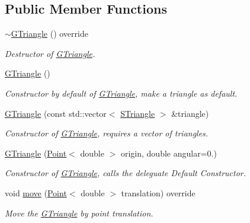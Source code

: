 \subsection*{Public Member Functions}
\begin{DoxyCompactItemize}
\item 
\mbox{\label{classGTriangle_a05bcaee071e6dc6591220869234b05ee}} 
\hyperlink{classGTriangle_a05bcaee071e6dc6591220869234b05ee}{$\sim$\+G\+Triangle} () override
\begin{DoxyCompactList}\small\item\em Destructor of \hyperlink{classGTriangle}{G\+Triangle}. \end{DoxyCompactList}\item 
\mbox{\label{classGTriangle_a10ffcfa49d2f3f8dc4b87b106dfe4456}} 
\hyperlink{classGTriangle_a10ffcfa49d2f3f8dc4b87b106dfe4456}{G\+Triangle} ()
\begin{DoxyCompactList}\small\item\em Constructor by default of \hyperlink{classGTriangle}{G\+Triangle}, make a triangle as default. \end{DoxyCompactList}\item 
\hyperlink{classGTriangle_a969f76093f398cda98268aba05d57336}{G\+Triangle} (const std\+::vector$<$ \hyperlink{classSTriangle}{S\+Triangle} $>$ \&triangle)
\begin{DoxyCompactList}\small\item\em Constructor of \hyperlink{classGTriangle}{G\+Triangle}, requires a vector of triangles. \end{DoxyCompactList}\item 
\hyperlink{classGTriangle_ae5a721f4da22b1c25d9305307d923a3e}{G\+Triangle} (\hyperlink{classPoint}{Point}$<$ double $>$ origin, double angular=0.)
\begin{DoxyCompactList}\small\item\em Constructor of \hyperlink{classGTriangle}{G\+Triangle}, calls the deleguate Default Constructor. \end{DoxyCompactList}\item 
void \hyperlink{classGTriangle_a89910a7f176743473d3bfd15de01377d}{move} (\hyperlink{classPoint}{Point}$<$ double $>$ translation) override
\begin{DoxyCompactList}\small\item\em Move the \hyperlink{classGTriangle}{G\+Triangle} by point translation. \end{DoxyCompactList}\item 

\end{DoxyCompactItemize}
